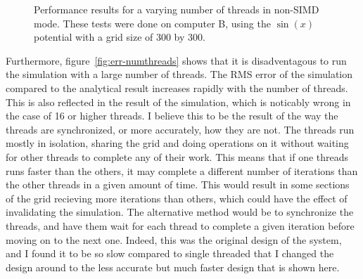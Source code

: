 \begin{figure}[h]
	\centering
\caption{Performance results for a varying number of threads in non-SIMD mode. These
tests were done on computer B, using the $\sin(x)$ potential with a grid size of 300 by 300.}
\label{fig:perf-numthreads}
\end{figure}



Furthermore, figure~\ref{fig:err-numthreads} shows that it is disadventagous to run the simulation with
a large number of threads. The RMS error of the simulation compared to the analytical result increases
rapidly with the number of threads. This is also reflected in the result of the simulation, which is
noticably wrong in the case of 16 or higher threads. I believe this to be the result of the way the threads
are synchronized, or more accurately, how they are not. The threads run mostly in isolation, sharing the
grid and doing operations on it without waiting for other threads to complete any of their work. This means
that if one threads runs faster than the others, it may complete a different number of iterations than the other
threads in a given amount of time. This would result in some sections of the grid recieving more iterations
than others, which could have the effect of invalidating the simulation. The alternative method would be
to synchronize the threads, and have them wait for each thread to complete a given iteration before moving on
to the next one. Indeed, this was the original design of the system, and I found it to be so slow compared to
single threaded that I changed the design around to the less accurate but much faster design that is shown here.



